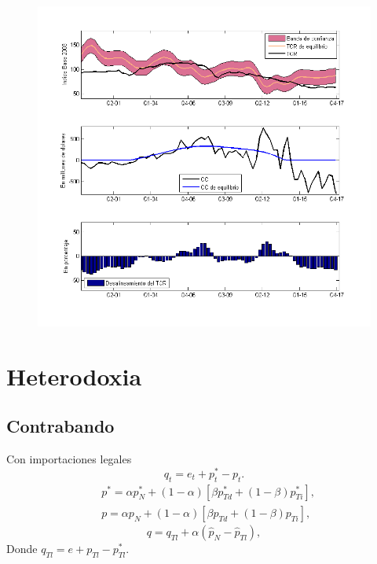 \documentclass[12pt]{beamer}
\begin{document}
\begin{frame}
\begin{figure}
\centering
\includegraphics[scale=0.41]{tcreq}
\end{figure}
\end{frame}

\section[Consideraciones]{Heterodoxia}
\subsection[Contrabando]{Contrabando}
\begin{frame}{Con importaciones legales}
\begin{equation}\label{tcrlog}
q_t=e_t+p_t^*-p_t.
\end{equation}
\begin{align}
&p^*=\alpha p_N^*+(1-\alpha)[\beta p_{Td}^*+(1-\beta)p_{Ti}^*],\\
&p=\alpha p_N+(1-\alpha)[\beta p_{Td}+(1-\beta)p_{Ti}],
\end{align}
\begin{equation}\label{mark}
q=q_{Tl}+\alpha (\hat{p}_{N} - \hat{p}_{Tl}),
\end{equation}
Donde $q_{Tl}=e+p_{Tl}-p_{Tl}^*$. 
\end{frame}
\end{document}
